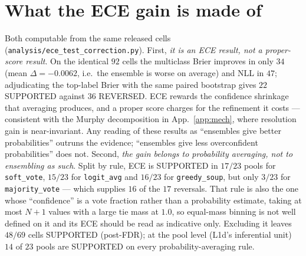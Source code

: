 \documentclass[11pt]{article}
\begin{document}
\section{What the ECE gain is made of}\label{app:ecequal}
Both computable from the same released cells (\texttt{analysis/\allowbreak ece\_\allowbreak test\_\allowbreak correction.\allowbreak py}). First, \emph{it is an ECE result, not a proper-score result}. On the identical $92$ cells the multiclass Brier improves in only $34$ (mean $\Delta{=}{-}0.0062$, i.e.\ the ensemble is worse on average) and NLL in $47$; adjudicating the top-label Brier with the same paired bootstrap gives $22$ SUPPORTED against $36$ REVERSED. ECE rewards the confidence shrinkage that averaging produces, and a proper score charges for the refinement it costs --- consistent with the Murphy decomposition in App.~\ref{app:mech}, where resolution gain is near-invariant. Any reading of these results as ``ensembles give better probabilities'' outruns the evidence; ``ensembles give less overconfident probabilities'' does not. Second, \emph{the gain belongs to probability averaging, not to ensembling as such}. Split by rule, ECE is SUPPORTED in $17/23$ pools for \texttt{soft\_vote}, $15/23$ for \texttt{logit\_avg} and $16/23$ for \texttt{greedy\_soup}, but only $3/23$ for \texttt{majority\_vote} --- which supplies $16$ of the $17$ reversals. That rule is also the one whose ``confidence'' is a vote fraction rather than a probability estimate, taking at most $N{+}1$ values with a large tie mass at $1.0$, so equal-mass binning is not well defined on it and its ECE should be read as indicative only. Excluding it leaves $48/69$ cells SUPPORTED (post-FDR); at the pool level (L1d's inferential unit) $14$ of $23$ pools are SUPPORTED on every probability-averaging rule.
\end{document}
